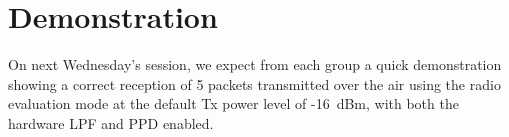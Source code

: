 \section{Demonstration}


On next Wednesday's session, we expect from each group a quick demonstration showing a correct reception of 5 packets transmitted over the air using the radio evaluation mode
at the default Tx power level of -16~dBm, with both the hardware LPF and PPD enabled.

\begin{comment}
\subsection{Report}

Please upload a report of \textbf{maximum} 2 pages with
\begin{enumerate}
    \item The output of the python testbench of the preamble detector (\texttt{3\_compare.py}), as well as your implementation of the Absolute-value norm.

    \item A summary of the resource usage (logic elements) and worst slack (setup) for the different compilation performed :
    \begin{enumerate}
        \item Initial design without register retiming and embedded multipliers.
        \item Initial design with register retiming and embedded multipliers.
        \item Final design with Absolute-value norm estimator.
    \end{enumerate}

    \item A breakdown of the resource usage for the final design including the Absolute-value norm. Focus mainly on logic cells/elements, for both the overall design (\texttt{lms7\_trx\_top}) and for the LimeSuite digital signal processing (\texttt{lms\_dsp)}. You can present it as a pie chart or an histogram. In both case, try to highlight the FIR (low-pass filter) and the preamble detector. You can find the required informations either in the \textit{Hierarchy} tab of the \textit{Project Navigator} view, or in the \textit{Analysis and Synthesis/Resource Utilization by Entity} tab of the compilation report.
\end{enumerate}
\end{comment}